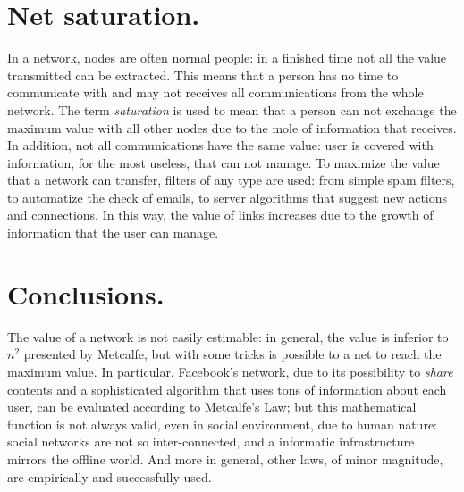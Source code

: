 \documentclass[12pt, a4page]{article}
\begin{document}
\section{Net saturation.}
In a network, nodes are often normal people: in a finished time not all the value transmitted can be extracted.
This means that a person has no time to communicate with and may not receives all communications from the whole network.
The term \textit{saturation} is used to mean that a person can not exchange the maximum value with all other nodes due to the mole of information that receives.
In addition, not all communications have the same value: user is covered with information, for the most useless, that can not manage. \newline
To maximize the value that a network can transfer, filters of any type are used: from simple spam filters, to automatize the check of emails, to server algorithms that suggest new actions and connections.
In this way, the value of links increases due to the growth of information that the user can manage. \newline

\section{Conclusions.}
The value of a network is not easily estimable: in general, the value is inferior to $n^2$ presented by Metcalfe, but with some tricks is possible to a net to reach the maximum value.
In particular, Facebook's network, due to its possibility to \textit{share} contents and a sophisticated algorithm that uses tons of information about each user, can be evaluated according to Metcalfe's Law; but this mathematical function is not always valid, even in social environment, due to human nature: social networks are not so inter-connected, and a informatic infrastructure mirrors the offline world. 
And more in general, other laws, of minor magnitude, are empirically and successfully used.
\newpage
\printbibliography
\end{document}
